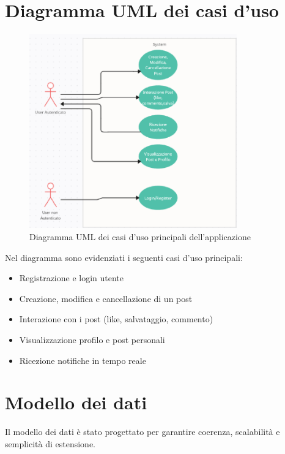 \documentclass[a4paper,12pt]{article}
\begin{document}
\section{Diagramma UML dei casi d’uso}
\begin{figure}[H]
    \centering
    \includegraphics[width=0.8\textwidth]{usecase.png}
    \caption{Diagramma UML dei casi d’uso principali dell’applicazione}
    \label{fig:usecase}
\end{figure}

\noindent
Nel diagramma sono evidenziati i seguenti casi d’uso principali:
\begin{itemize}
    \item Registrazione e login utente
    \item Creazione, modifica e cancellazione di un post
    \item Interazione con i post (like, salvataggio, commento)
    \item Visualizzazione profilo e post personali
    \item Ricezione notifiche in tempo reale
\end{itemize}

\section{Modello dei dati}
Il modello dei dati è stato progettato per garantire coerenza, scalabilità e semplicità di estensione.
\end{document}
